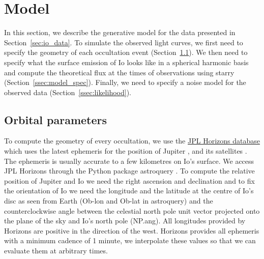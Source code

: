 \documentclass[12pt,dvipsnames]{report}
\begin{document}
\section{Model}
\label{sec:io_model}
In this section, we describe the generative model for the data presented in Section~\ref{sec:io_data}.
To simulate the observed light curves, we first need to specify the geometry of each occultation event (Section~\ref{ssec:orbital_parameters}). 
We then need to specify what the surface emission of Io looks like in a spherical harmonic basis and compute the theoretical flux at the times of observations using \textsf{starry} (Section~\ref{ssec:model_spec}).
Finally, we need to specify a noise model for the observed data (Section~\ref{ssec:likelihood}).

\subsection{Orbital parameters}
\label{ssec:orbital_parameters}
To compute the geometry of every occultation, we use the 
\href{https://ssd.jpl.nasa.gov/horizons.cgi}{JPL Horizons database} which uses the 
latest ephemeris for the position of Jupiter \citep{2014IPNPR.196C...1F}, and its 
satellites \citep{2015IAUGA..2233438J}.
The ephemeris is usually accurate to a few kilometres on Io's surface.
We access JPL Horizons through the Python package \textsf{astroquery} 
\citep{2019AJ....157...98G}.
To compute the relative position of Jupiter and Io we need the right ascension and 
declination and to fix the orientation of Io we need the longitude and the latitude 
at the centre of Io's disc as seen from Earth (\textsf{Ob-lon} and \textsf{Ob-lat} in 
\textsf{astroquery}) and the counterclockwise angle between the celestial north pole 
unit vector projected onto the plane of the sky and Io's north pole (\textsf{NP.ang}).
All longitudes provided by Horizons are positive  in the direction of the west.
Horizons provides all ephemeris with a minimum cadence of 1 minute, we interpolate these 
values so that we can evaluate them at arbitrary times.
\end{document}
